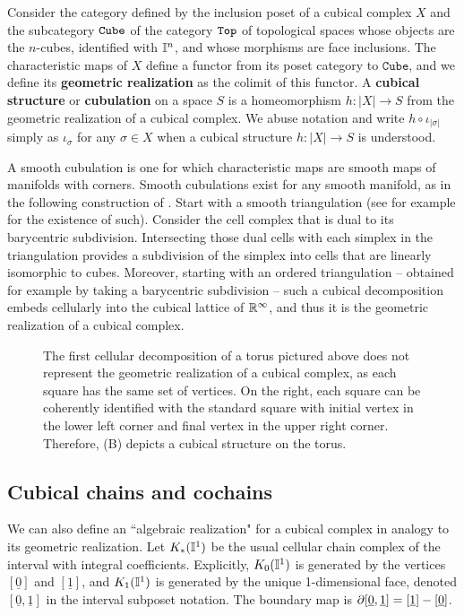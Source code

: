 Consider the category defined by the inclusion poset of a cubical complex $X$ and the subcategory ${\tt Cube}$ of the category ${\tt Top}$ of topological spaces whose objects are the $n$-cubes, identified with $\mathbb{I}^n$, and whose morphisms are face inclusions.
The characteristic maps of $X$ define a functor from its poset category to $\mathtt{Cube}$, and we define its \textbf{geometric realization} as the colimit of this functor.
A \textbf{cubical structure} or \textbf{cubulation} on a space $S$ is a homeomorphism $h \colon |X| \to S$ from the geometric realization of a cubical complex.
We abuse notation and write $h \circ \iota_{|\sigma|}$ simply as $\iota_\sigma$ for any $\sigma \in X$ when a cubical structure $h \colon |X| \to S$ is understood.

A smooth cubulation is one for which characteristic maps are smooth maps of manifolds with corners.
Smooth cubulations exist for any smooth manifold, as in the following construction of \cite{ShSh92}.
Start with a smooth triangulation (see for example \cite[Theorem 10.6]{MUNK66} for the existence of such).
Consider the cell complex that is dual to its barycentric subdivision.
Intersecting those dual cells with each simplex in the triangulation provides a subdivision of the simplex into cells that are linearly isomorphic to cubes.
Moreover, starting with an ordered triangulation -- obtained for example by taking a barycentric subdivision -- such a cubical decomposition embeds cellularly into the cubical lattice of $\mathbb{R}^\infty$, and thus it is the geometric realization of a cubical complex.

\begin{figure}
	
	\caption{The first cellular decomposition of a torus pictured above does not represent the geometric realization of a cubical complex, as each square has the same set of vertices.
	On the right, each square can be coherently identified with the standard square with initial vertex in the lower left corner and final vertex in the upper right corner.
	Therefore, (B) depicts a cubical structure on the torus.}
\label{F: cubical structure}
\end{figure}

\subsection{Cubical chains and cochains}\label{S: cubical cochains}

We can also define an ``algebraic realization" for a cubical complex in analogy to its geometric realization.
Let $K_*(\mathbb{I}^1)$ be the usual cellular chain complex of the interval with integral coefficients.
Explicitly, $K_0(\mathbb{I}^1)$ is generated by the vertices $[\underline{0}]$ and $[\underline{1}]$, and $K_1(\mathbb{I}^1)$ is generated by the unique 1-dimensional face, denoted $[\underline{0},\underline{1}]$ in the interval subposet notation.
The boundary map is $\partial [\underline{0},\underline{1}] = [\underline{1}]-[\underline{0}]$.

